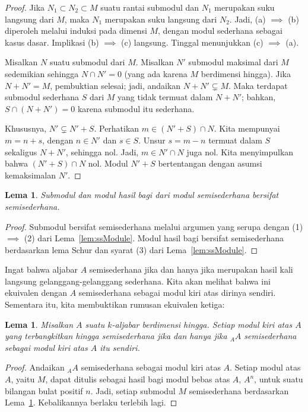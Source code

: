 \documentclass[12pt]{article}
\theoremstyle{plain}
\newtheorem{lemma}[theorem]{Lema}
\theoremstyle{definition}
\theoremstyle{remark}
\numberwithin{equation}{section}
\begin{document}
\begin{proof}
Jika $N_1 \subset N_2 \subset M$ suatu rantai submodul dan $N_1$ merupakan
suku langsung dari $M$, maka $N_1$ merupakan suku langsung dari $N_2$.
Jadi, (a) $\implies$ (b) diperoleh melalui induksi pada dimensi $M$,
dengan modul sederhana sebagai kasus dasar. Implikasi (b) $\implies$
(c) langsung. Tinggal menunjukkan (c) $\implies$ (a).

Misalkan $N$ suatu submodul dari $M$.
Misalkan $N'$ submodul maksimal dari $M$ sedemikian sehingga $N \cap N' = 0$
(yang ada karena $M$ berdimensi hingga).
Jika $N + N' = M$, pembuktian selesai; jadi, andaikan $N + N' \subsetneq M$.
Maka terdapat submodul sederhana $S$ dari $M$ yang tidak termuat dalam $N+N'$;
bahkan, $S \cap (N+N')=0$ karena submodul itu sederhana.

Khususnya, $N' \subsetneq N'+S$.
Perhatikan $m \in (N'+S) \cap N$. Kita mempunyai $m=n+s$, dengan $n \in N'$
dan $s \in S$. Unsur $s=m-n$ termuat dalam $S$ sekaligus $N+N'$, sehingga
nol. Jadi, $m \in N' \cap N$ juga nol.
Kita menyimpulkan bahwa $(N'+S) \cap N$ nol.
Modul $N'+S$ bertentangan dengan asumsi kemaksimalan
$N'$.
\end{proof}

\begin{lemma} \label{lem:subquot}
Submodul dan modul hasil bagi dari modul semisederhana bersifat semisederhana.
\end{lemma}

\begin{proof}
Submodul bersifat semisederhana melalui argumen yang serupa dengan
(1) $\implies$ (2) dari Lema~\ref{lem:ssModule}.
Modul hasil bagi bersifat semisederhana berdasarkan lema Schur dan
syarat (3) dari Lema~\ref{lem:ssModule}.
\end{proof}

Ingat bahwa aljabar $A$ semisederhana jika dan hanya jika merupakan hasil kali
langsung gelanggang-gelanggang sederhana. Kita akan melihat bahwa ini ekuivalen dengan $A$
semisederhana sebagai modul kiri atas dirinya sendiri. Sementara itu, kita membuktikan
rumusan ekuivalen ketiga:

\begin{lemma}
Misalkan $A$ suatu $k$-aljabar berdimensi hingga.
Setiap modul kiri atas $A$ yang terbangkitkan hingga semisederhana jika dan hanya jika
${}_AA$ semisederhana sebagai modul kiri atas $A$ itu sendiri.
\end{lemma}

\begin{proof}
Andaikan ${}_AA$ semisederhana sebagai modul kiri atas $A$.
Setiap modul atas $A$, yaitu $M$, dapat ditulis sebagai hasil bagi modul bebas atas $A$,
$A^n$, untuk suatu bilangan bulat positif $n$.
Jadi, setiap submodul $M$ semisederhana berdasarkan Lema~\ref{lem:subquot}.
Kebalikannya berlaku terlebih lagi.
\end{proof}
\end{document}
